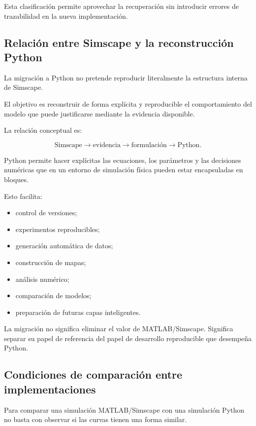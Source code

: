 Esta clasificación permite aprovechar la recuperación sin introducir errores de trazabilidad en la nueva implementación.

\subsection{Relación entre Simscape y la reconstrucción Python}

La migración a Python no pretende reproducir literalmente la estructura interna de Simscape.

El objetivo es reconstruir de forma explícita y reproducible el comportamiento del modelo que puede justificarse mediante la evidencia disponible.

La relación conceptual es:

\begin{equation}
\text{Simscape}
\rightarrow
\text{evidencia}
\rightarrow
\text{formulación}
\rightarrow
\text{Python}.
\end{equation}

Python permite hacer explícitas las ecuaciones, los parámetros y las decisiones numéricas que en un entorno de simulación física pueden estar encapsuladas en bloques.

Esto facilita:

\begin{itemize}
    \item control de versiones;
    \item experimentos reproducibles;
    \item generación automática de datos;
    \item construcción de mapas;
    \item análisis numérico;
    \item comparación de modelos;
    \item preparación de futuras capas inteligentes.
\end{itemize}

La migración no significa eliminar el valor de MATLAB/Simscape. Significa separar su papel de referencia del papel de desarrollo reproducible que desempeña Python.

\subsection{Condiciones de comparación entre implementaciones}

Para comparar una simulación MATLAB/Simscape con una simulación Python no basta con observar si las curvas tienen una forma similar.

